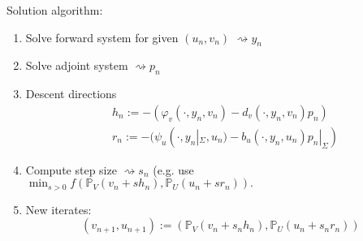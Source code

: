 \documentclass[
12pt, %
a4paper, %
onecolumn, %
portrait %
]{article}
\begin{document}
Solution algorithm:\\
\begin{enumerate}
\item Solve forward system for given $(u_n, v_n)$ $\rightsquigarrow y_n$ \\
\item Solve adjoint system $\rightsquigarrow p_n$ \\
\item Descent directions
\begin{align*}
&h_n := -(\varphi_v(\cdot, y_n, v_n) - d_v(\cdot,y_n,v_n) p_n) \\ 
&r_n := -(\psi_u(\cdot, y_n |_{\Sigma}, u_n) - b_u(\cdot,y_n,u_n) p_n |_{\Sigma})
\end{align*}
\item Compute step size $\rightsquigarrow s_n$
(e.g. use $\min_{s > 0} f(\mathbb{P}_V(v_n+s h_n), \mathbb{P}_U(u_n + s r_n)).$
\item New iterates:
\begin{equation}
(v_{n+1}, u_{n+1}) := (\mathbb{P}_V(v_n + s_n h_n), \mathbb{P}_U(u_n + s_n r_n))
\end{equation}
\end{enumerate}
\newpage

\renewcommand{\refname}{Reference} %




\end{document}
